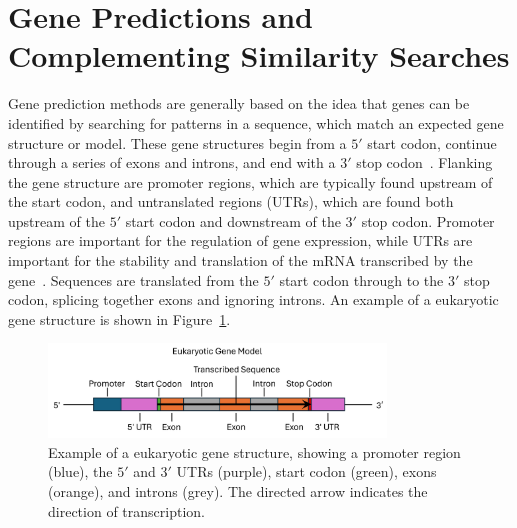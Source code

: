 

\section{Gene Predictions and Complementing Similarity Searches}
\label{lit:similarity-searches}
Gene prediction methods are generally based on the idea that genes can be
identified by searching for patterns in a sequence, which match an expected gene structure or model. These gene structures begin from a $5'$ start codon, continue through a series of exons and introns, and end with a $3'$ stop codon~\cite{loftus2003a}. Flanking the gene structure are promoter regions, which are typically found upstream of the start codon, and untranslated regions (UTRs), which are found both upstream of the $5'$ start codon and downstream of the $3'$ stop codon. Promoter regions are important for the regulation of gene expression, while UTRs are important for the stability and translation of the mRNA transcribed by the gene~\cite{loftus2003a}. Sequences are translated from the $5'$ start codon through to the $3'$ stop codon, splicing together exons and ignoring introns. An example of a eukaryotic gene structure is shown in Figure~\ref{fig:gene-structure}.

\begin{figure}[ht]
    \centering
    \includegraphics[width=0.8\textwidth]{figures/gene-model-fig-msc.png}
    \caption[Generic gene model]{Example of a eukaryotic gene structure, showing a promoter region (blue), the $5'$ and $3'$ UTRs (purple), start codon (green), exons (orange), and introns (grey). The directed arrow indicates the direction of transcription. }
    \label{fig:gene-structure}
\end{figure}

